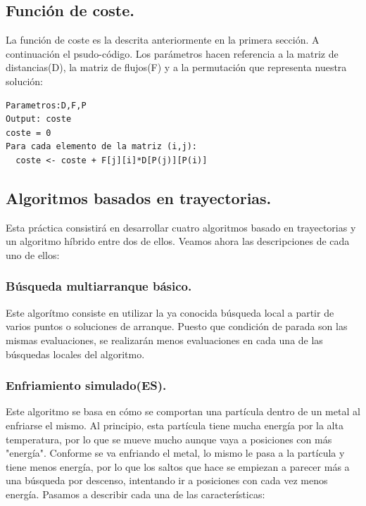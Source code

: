 \subsection{Función de coste.}

La función de coste es la descrita anteriormente en la primera sección. A continuación el psudo-código. Los parámetros hacen referencia a la matriz de distancias(D), la matriz de flujos(F) y a la permutación que representa nuestra solución:\\

\begin{lstlisting}
Parametros:D,F,P
Output: coste
coste = 0
Para cada elemento de la matriz (i,j):
  coste <- coste + F[j][i]*D[P(j)][P(i)]
\end{lstlisting}


\subsection{Algoritmos basados en trayectorias.}

Esta práctica consistirá en desarrollar cuatro algoritmos basado en trayectorias y un algoritmo híbrido entre dos de ellos. Veamos ahora las descripciones de cada uno de ellos:\\

\subsubsection{Búsqueda multiarranque básico.}

Este algorítmo consiste en utilizar la ya conocida búsqueda local a partir de varios puntos o soluciones de arranque. Puesto que  condición de parada son las mismas evaluaciones, se realizarán menos evaluaciones en cada una de las búsquedas locales del algoritmo. 

\subsubsection{Enfriamiento simulado(ES).}

Este algoritmo se basa en cómo  se comportan una partícula dentro de un metal al enfriarse el mismo. Al principio, esta partícula tiene mucha energía por la alta temperatura, por lo que se mueve mucho aunque vaya a posiciones con más "energía". Conforme se va enfriando el metal, lo mismo le pasa a la partícula y tiene menos energía, por lo que los saltos que hace se empiezan a parecer más a una búsqueda por descenso, intentando ir a posiciones con cada vez menos energía. Pasamos a describir cada una de las características:

